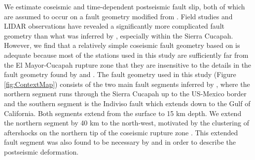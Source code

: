 \documentclass[review]{elsarticle}
\begin{document}
We estimate coseismic and time-dependent postseismic fault slip, both of which are assumed to occur on a fault geometry modified from \citet{Wei2011}.  Field studies \citep{Fletcher2014} and LIDAR observations \citep{Oskin2012} have revealed a significantly more complicated fault geometry than what was inferred by \citet{Wei2011}, especially within the Sierra Cucapah.  However, we find that a relatively simple coseismic fault geometry based on \citep{Wei2011} is adequate because most of the stations used in this study are sufficiently far from the El Mayor-Cucapah rupture zone that they are insensitive to the details in the fault geometry found by \citet{Fletcher2014} and \citet{Oskin2012}.  The fault geometry used in this study (Figure \ref{fig:ContextMap}) consists of the two main fault segments inferred by \citet{Wei2011}, where the northern segment runs through the Sierra Cucapah up to the US-Mexico border and the southern segment is the Indiviso fault which extends down to the Gulf of California. Both segments extend from the surface to 15 km depth.  We extend the northern segment by 40 km to the north-west, motivated by the clustering of aftershocks on the northern tip of the coseismic rupture zone \citep{Hauksson2011,Kroll2013}.  This extended fault segment was also found to be necessary by \citet{Rollins2015} and \citet{Pollitz2012} in order to describe the postseismic deformation. 

\end{document}
